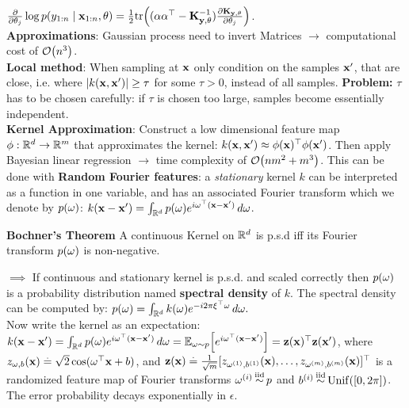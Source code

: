 $\pdv{}{\theta_j} \log p(y_{1:n} \mid \vx_{1:n}, \vtheta) = \frac{1}{2} \tr{(\valpha \transpose{\valpha} - \inv{\mK_{\vy,\vtheta}}) \pdv{\mK_{\vy,\vtheta}}{\theta_j}}$.\\
\textbf{Approximations}: Gaussian process need to invert Matrices $\rightarrow$ computational cost of $\BigO{n^3}$. \\ 
\textbf{Local method}: When sampling at $\mathbf{x}$ only condition on the samples $\mathbf{x'}$, that are close, i.e. where $\left| k(\mathbf{x}, \mathbf{x'}) \right| \geq \tau$ for some $\tau > 0$, instead of all samples. \textbf{Problem:} $\tau$ has to be chosen carefully: if $\tau$ is chosen too large, samples become essentially independent. \\
\textbf{Kernel Approximation}: Construct a low dimensional feature map $\mathbf{\phi} : \mathbb{R}^d \to \mathbb{R}^m$ that approximates the kernel: $k(\mathbf{x}, \mathbf{x'}) \approx \mathbf{\phi}(\mathbf{x})^\top \mathbf{\phi}(\mathbf{x'})$. Then apply Bayesian linear regression $\rightarrow$ time complexity of $\BigO{n m^2 + m^3}$. This can be done with \textbf{Random Fourier features}: a \textit{stationary} kernel $k$ can be interpreted as a function in one variable, and has an associated Fourier transform which we denote by $p(\mathbf{\omega})$: $k(\mathbf{x}-\mathbf{x'}) = \int_{\mathbb{R}^d} p(\mathbf{\omega}) e^{i \mathbf{\omega}^\top (\mathbf{x}-\mathbf{x'})} \,d\mathbf{\omega}$.
\begin{framed}
    \textbf{Bochner's Theorem} A continuous Kernel on $\mathbb{R}^d$ is p.s.d iff its Fourier transform $p(\mathbf{\omega})$ is non-negative.
\end{framed}
$\implies$ If continuous and stationary kernel is p.s.d. and scaled correctly then $p(\mathbf{\omega})$ is a probability distribution named \textbf{spectral density} of $k$. The spectral density can be computed by: $p(\mathbf{\omega}) = \int_{\mathbb{R}^d} k(\mathbf{\omega}) e^{- i 2 \pi \mathbf{\xi}^\top \mathbf{\omega}} \,d\mathbf{\omega}.$ \\ Now write the kernel as an expectation: $k(\vx-\vxp) = \int_{\R^d} p(\vomega) e^{i \transpose{\vomega} (\vx-\vxp)} \,d\vomega = \E[\vomega \sim p]{e^{i \transpose{\vomega}(\vx-\vxp)}}= \transpose{\vz(\vx)} \vz(\vxp)$, where $z_{\mathbf{\omega},b}(\mathbf{x}) \overset{.}{=} \sqrt{2} \cos(\mathbf{\omega}^\top \mathbf{x} + b)$, and $\mathbf{z}(\mathbf{x}) \overset{.}{=} \frac{1}{\sqrt{m}} [z_{\mathbf{\omega}^{(1)},b^{(1)}}(\mathbf{x}), \dots, z_{\mathbf{\omega}^{(m)},b^{(m)}}(\mathbf{x})]^\top$ is a randomized feature map of Fourier transforms $\mathbf{\omega}^{(i)} \operatorname*{\smash{\overset{\mathrm{iid}}{\sim}}} p$ and $b^{(i)} \iid \Unif{\brackets{0, 2 \pi}}$. The error probability decays exponentially in $\epsilon$.
